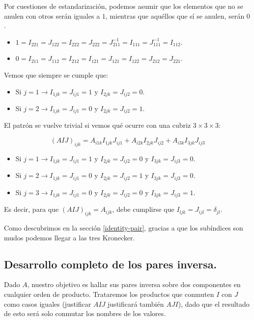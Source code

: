 Por cuestiones de estandarización, podemos asumir que los elementos que no se anulen con otros serán iguales a $1$, mientras que aquéllos que sí se anulen, serán $0$.

\begin{itemize}
	\item $1 = I_{221} = J_{122} = I_{222} = J_{222} = J_{211}^{-1} = I_{111} = J_{111}^{-1} = I_{112}$.
	\item $0 = I_{211} = J_{112} = I_{212} = I_{121} = J_{121} = I_{122} = J_{212} = J_{221}$.
\end{itemize}

Vemos que siempre se cumple que:

\begin{itemize}
	\item Si $j = 1 \rightarrow I_{1jk} = J_{ij1} = 1$ y $I_{2jk} = J_{ij2} = 0$.
	\item Si $j = 2 \rightarrow I_{1jk} = J_{ij1} = 0$ y $I_{2jk} = J_{ij2} = 1$.
\end{itemize}

El patrón se vuelve trivial si vemos qué ocurre con una cubriz $3 \times 3 \times 3$:

$$(AIJ)_{ijk} = A_{i1k} I_{1jk} J_{ij1} + A_{i2k} I_{2jk} J_{ij2} + A_{i3k} I_{3jk} J_{ij3}$$

\begin{itemize}
	\item Si $j = 1 \rightarrow I_{1jk} = J_{ij1} = 1$ y $I_{2jk} = J_{ij2} = 0$ y $I_{3jk} = J_{ij3} = 0$.
	\item Si $j = 2 \rightarrow I_{1jk} = J_{ij1} = 0$ y $I_{2jk} = J_{ij2} = 1$ y $I_{3jk} = J_{ij3} = 0$.
	\item Si $j = 3 \rightarrow I_{1jk} = J_{ij1} = 0$ y $I_{2jk} = J_{ij2} = 0$ y $I_{3jk} = J_{ij3} = 1$.
\end{itemize}

Es decir, para que $(AIJ)_{ijk} = A_{ijk}$, debe cumplirse que $I_{ljk} = J_{ijl} = \delta_{jl}$.

Como descubrimos en la sección \ref{identity-pair}, gracias a que los subíndices son mudos podemos llegar a las tres Kronecker.

\subsection{Desarrollo completo de los pares inversa.} \label{appendix-3}

Dado $A$, nuestro objetivo es hallar sus pares inversa sobre dos componentes en cualquier orden de producto. Trataremos los productos que conmuten $I$ con $J$ como casos iguales (justificar $AIJ$ justificará también $AJI$), dado que el resultado de esto será solo conmutar los nombres de los valores.

